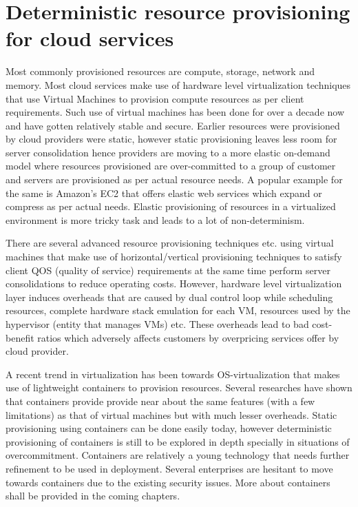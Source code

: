  \section{Deterministic resource provisioning for cloud services}
  
    Most commonly provisioned resources are compute, storage, network and memory. Most cloud services make use of hardware level 
virtualization techniques that use Virtual Machines to provision compute resources as per client requirements. Such use of virtual machines 
has been done for over a decade now and have gotten relatively stable and secure. Earlier resources were provisioned by cloud providers 
were static, however static provisioning leaves less room for server consolidation hence providers are moving to a more elastic on-demand 
model where resources provisioned are over-committed to a group of customer and servers are provisioned as per actual resource needs. A 
popular example for the same is Amazon's EC2 \cite{amazonec2} that offers elastic web services which expand or compress as per actual 
needs. Elastic provisioning of resources in a virtualized environment is more tricky task and leads to a lot of non-determinism. 

    There are several advanced resource provisioning techniques \cite{dornemann2009demand} \cite{shen2011cloudscale} 
\cite{moreno2009elastic} \cite{calheiros2012aneka} etc. using virtual machines that make use of horizontal/vertical provisioning techniques 
to satisfy client QOS (quality of service) requirements at the same time perform server consolidations to reduce operating costs. However, 
hardware level virtualization layer induces overheads that are caused by dual control loop while scheduling resources, complete hardware 
stack emulation for each VM, resources used by the hypervisor (entity that manages VMs) etc. These overheads lead to bad cost-benefit ratios 
which adversely affects customers by overpricing services offer by cloud provider.
  
    A recent trend in virtualization has been towards OS-virtualization that makes use of lightweight containers to provision resources. 
Several researches \cite{felter2015updated} \cite{morabito2015hypervisors} \cite{agarwal2015containing} \cite{beserra2015performance} 
\cite{rathore2013kvm} have shown that containers provide provide near about the same features (with a few limitations) as that of virtual 
machines but with much lesser overheads. Static provisioning using containers can be done easily today, however deterministic provisioning 
of containers is still to be explored in depth specially in situations of overcommitment. Containers are relatively a young technology that 
needs further refinement to be used in deployment. Several enterprises are hesitant to move towards containers due to the existing security 
issues. More about containers shall be provided in the coming chapters.


